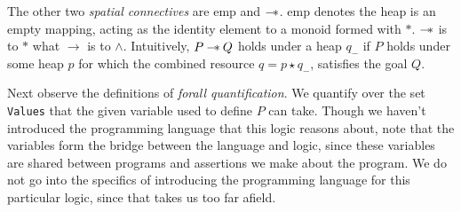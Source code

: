 The other two \emph{spatial connectives} are $\mathrm{emp}$ and $\mathbin{-\!*}$. $\mathrm{emp}$ denotes the heap is an empty mapping, acting as the identity element to a monoid formed with $*$. $\mathbin{-\!*}$ is to $*$ what $\to$ is to $\wedge$. Intuitively, $P \mathbin{-\!*} Q$ holds
under a heap $q_-$ if $P$ holds under some heap $p$ for which the combined resource $q = p \star q_-$, satisfies the goal $Q$.

Next observe the definitions of \emph{forall quantification}. We quantify over the set \texttt{Values} that the given variable used to define $P$ can take. Though we haven't
introduced the programming language that this logic reasons about, note that the variables form the bridge between the language and logic, since these variables are shared between
programs and assertions we make about the program. We do not go into the specifics of introducing the programming language for this particular logic, since that takes us too far afield.


